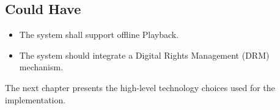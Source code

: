 \subsection*{Could Have}
\begin{itemize}
    \item The system shall support offline Playback.
    \item The system should integrate a Digital Rights Management (DRM) mechanism.
\end{itemize}

The next chapter presents the high-level technology choices used for the implementation.